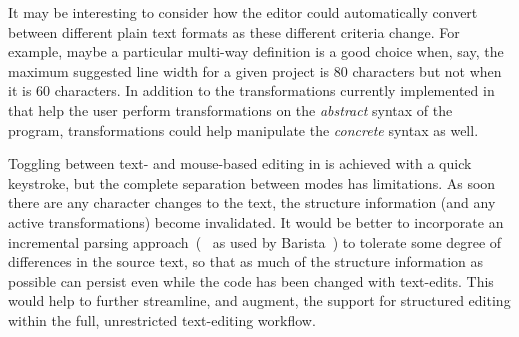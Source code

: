 It may be interesting to consider how the editor could automatically
convert between different plain text formats as these different
criteria change. For example, maybe a particular multi-way definition
is a good choice when, say, the maximum suggested line width for a
given project is 80 characters but not when it is 60 characters. In
addition to the transformations currently implemented in \deuce{} that
help the user perform transformations on the \emph{abstract} syntax of
the program, transformations could help manipulate the \emph{concrete}
syntax as well.



Toggling between text- and mouse-based editing in \deuce{} is achieved
with a quick keystroke, but the complete separation between modes has limitations.
As soon there are any character changes to the text, the structure
information (and any active transformations) become invalidated. It
would be better to incorporate an incremental
parsing approach~(\eg{}~\cite{Wagner:1998} as used by
Barista~\citep{Barista}) to tolerate some degree of
differences in the source text, so that as much of the structure
information as possible can persist even while the code
has been changed with text-edits. This would help to further
streamline, and augment, the support for structured editing within the
full, unrestricted text-editing workflow.
